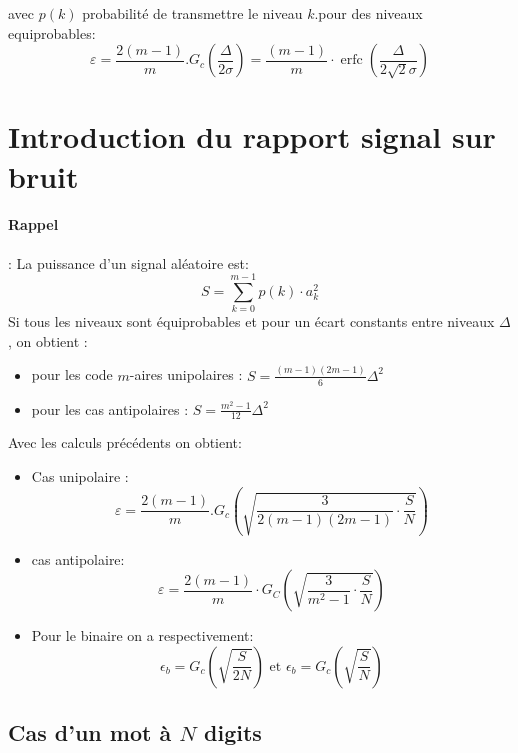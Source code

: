 \documentclass[main.tex]{subfiles}
\begin{document}
avec $p(k)$ probabilité de transmettre le niveau $k$.pour des niveaux
equiprobables:
\[
\varepsilon=\frac{2(m-1)}{m} . G_{c}\left(\frac{\Delta}{2 \sigma}\right)=\frac{(m-1)}{m} \cdot \operatorname{erfc}\left(\frac{\Delta}{2 \sqrt{2} \sigma}\right)
\]

\section{Introduction du rapport signal sur bruit}
\paragraph{Rappel}: La puissance d'un signal aléatoire est:
\[
S=\sum_{k=0}^{m-1} p(k) \cdot a_{k}^{2}
\]
Si tous les niveaux sont équiprobables et pour un écart constants entre
niveaux $\Delta$, on obtient :

\begin{itemize}
\item pour les code $m$-aires unipolaires : $S=\frac{(m-1)(2 m-1)}{6}
  \Delta^{2}$
\item pour les cas antipolaires :
  $S=\frac{m^{2}-1}{12} \Delta^{2}$
\end{itemize}


\begin{prop}
  Avec les calculs précédents on obtient:
  \begin{itemize}
  \item Cas unipolaire :
    \[\varepsilon=\frac{2(m-1)}{m} . G_{c}\left(\sqrt{\frac{3}{2(m-1)(2 m-1)} \cdot \frac{S}{N}}\right)\]
  \item cas antipolaire:
    \[
\varepsilon=\frac{2(m-1)}{m} \cdot G_{C}\left(\sqrt{\frac{3}{m^{2}-1} \cdot \frac{S}{N}}\right)
\]
\item Pour le binaire on a respectivement:
  \[
    \epsilon_b = G_c\left(\sqrt{\frac{S}{2N}}\right) \text{ et } \epsilon_b = G_c\left(\sqrt{\frac{S}{N}}\right)
  \]
  \end{itemize}
\end{prop}
\subsection{Cas d'un mot à $N$ digits}
\end{document}
